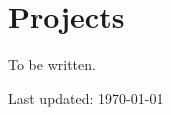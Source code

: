 \documentclass[11pt, a4paper]{article} %
\begin{document}
\section*{Projects}
To be written.








\vfill{} %


\begin{center}
{\scriptsize Last updated: \today}
\end{center}

\end{document}
